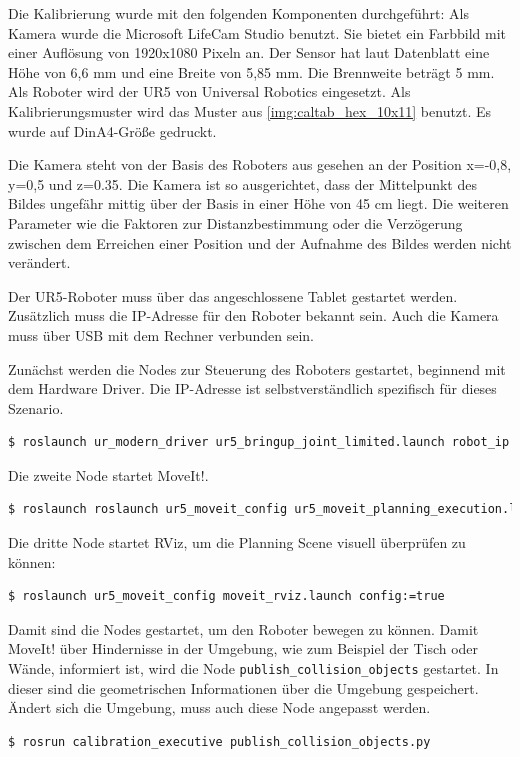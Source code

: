 Die Kalibrierung wurde mit den folgenden Komponenten durchgeführt: Als Kamera wurde die Microsoft LifeCam Studio benutzt. Sie bietet ein Farbbild mit einer Auflösung von 1920x1080 Pixeln an. Der Sensor hat laut Datenblatt eine Höhe von 6,6 mm und eine Breite von 5,85 mm. Die Brennweite beträgt 5 mm. Als Roboter wird der UR5 von Universal Robotics eingesetzt. Als Kalibrierungsmuster wird das Muster aus \autoref{img:caltab_hex_10x11} benutzt. Es wurde auf DinA4-Größe gedruckt.

Die Kamera steht von der Basis des Roboters aus gesehen an der Position x=-0,8, y=0,5 und z=0.35. Die Kamera ist so ausgerichtet, dass der Mittelpunkt des Bildes ungefähr mittig über der Basis in einer Höhe von 45 cm liegt. Die weiteren Parameter wie die Faktoren zur Distanzbestimmung oder die Verzögerung zwischen dem Erreichen einer Position und der Aufnahme des Bildes werden nicht verändert.

Der UR5-Roboter muss über das angeschlossene Tablet gestartet werden. Zusätzlich muss die IP-Adresse für den Roboter bekannt sein. Auch die Kamera muss über USB mit dem Rechner verbunden sein.

Zunächst werden die Nodes zur Steuerung des Roboters gestartet, beginnend mit dem Hardware Driver. Die IP-Adresse ist selbstverständlich spezifisch für dieses Szenario.
\begin{lstlisting}[language=bash]
  $ roslaunch ur_modern_driver ur5_bringup_joint_limited.launch robot_ip:=192.168.102.95
\end{lstlisting}
Die zweite Node startet MoveIt!.
\begin{lstlisting}[language=bash]
  $ roslaunch roslaunch ur5_moveit_config ur5_moveit_planning_execution.launch limited:=true
\end{lstlisting}
Die dritte Node startet RViz, um die Planning Scene visuell überprüfen zu können:
\begin{lstlisting}[language=bash]
  $ roslaunch ur5_moveit_config moveit_rviz.launch config:=true
\end{lstlisting}

Damit sind die Nodes gestartet, um den Roboter bewegen zu können. Damit MoveIt! über Hindernisse in der Umgebung, wie zum Beispiel der Tisch oder Wände, informiert ist, wird die Node \texttt{publish\_collision\_objects} gestartet. In dieser sind die geometrischen Informationen über die Umgebung gespeichert. Ändert sich die Umgebung, muss auch diese Node angepasst werden.
\begin{lstlisting}[language=bash]
  $ rosrun calibration_executive publish_collision_objects.py
\end{lstlisting}

